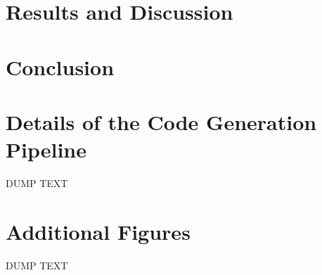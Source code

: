 \documentclass[conference]{IEEEtran}
\begin{document}
\section{Results and Discussion}

\section{Conclusion}

\appendices
\section{Details of the Code Generation Pipeline}
DUMP TEXT

\section{Additional Figures}
DUMP TEXT



\vspace{12pt}
\end{document}

